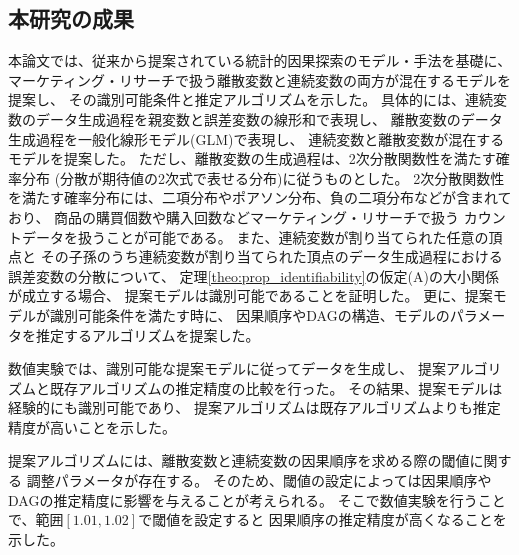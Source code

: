 
\subsection{本研究の成果}

本論文では、従来から提案されている統計的因果探索のモデル・手法を基礎に、
マーケティング・リサーチで扱う離散変数と連続変数の両方が混在するモデルを提案し、
その識別可能条件と推定アルゴリズムを示した。
具体的には、連続変数のデータ生成過程を親変数と誤差変数の線形和で表現し、
離散変数のデータ生成過程を一般化線形モデル(GLM)で表現し、
連続変数と離散変数が混在するモデルを提案した。
ただし、離散変数の生成過程は、2次分散関数性を満たす確率分布
(分散が期待値の2次式で表せる分布)に従うものとした。
2次分散関数性を満たす確率分布には、二項分布やポアソン分布、負の二項分布などが含まれており、
商品の購買個数や購入回数などマーケティング・リサーチで扱う
カウントデータを扱うことが可能である。
また、連続変数が割り当てられた任意の頂点と
その子孫のうち連続変数が割り当てられた頂点のデータ生成過程における誤差変数の分散について、
定理\ref{theo:prop_identifiability}の仮定(A)の大小関係が成立する場合、
提案モデルは識別可能であることを証明した。
更に、提案モデルが識別可能条件を満たす時に、
因果順序やDAGの構造、モデルのパラメータを推定するアルゴリズムを提案した。

数値実験では、識別可能な提案モデルに従ってデータを生成し、
提案アルゴリズムと既存アルゴリズムの推定精度の比較を行った。
その結果、提案モデルは経験的にも識別可能であり、
提案アルゴリズムは既存アルゴリズムよりも推定精度が高いことを示した。

提案アルゴリズムには、離散変数と連続変数の因果順序を求める際の閾値に関する
調整パラメータが存在する。
そのため、閾値の設定によっては因果順序やDAGの推定精度に影響を与えることが考えられる。
そこで数値実験を行うことで、範囲$[1.01, 1.02]$で閾値を設定すると
因果順序の推定精度が高くなることを示した。
